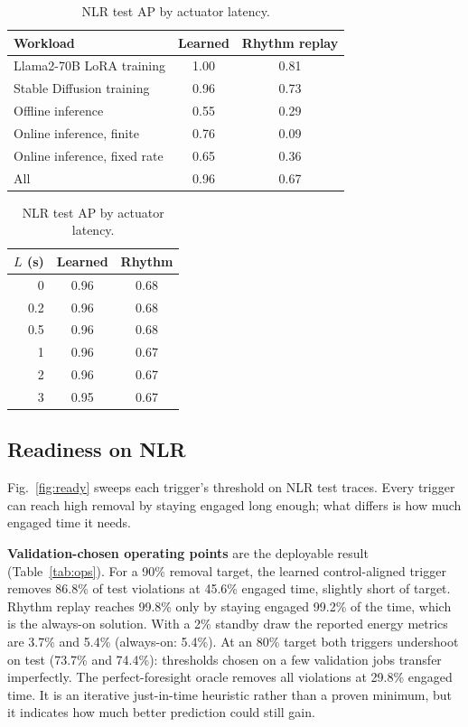 \documentclass[11pt]{article}
\begin{document}
\begin{table}[t]
\centering
\begin{minipage}[t]{0.55\textwidth}
\centering
\caption{NLR test AP on the control-aligned target, 1~s latency. Per-workload rows are point estimates;
each inference workload is a single session, so no interval is computed.}
\label{tab:wl}
\small
\begin{tabular}{@{}lcc@{}}
\toprule
Workload & Learned & Rhythm replay \\
\midrule
Llama2-70B LoRA training & 1.00 & 0.81 \\
Stable Diffusion training & 0.96 & 0.73 \\
Offline inference & 0.55 & 0.29 \\
Online inference, finite & 0.76 & 0.09 \\
Online inference, fixed rate & 0.65 & 0.36 \\
\midrule
All & 0.96 & 0.67 \\
\bottomrule
\end{tabular}
\end{minipage}\hfill
\begin{minipage}[t]{0.4\textwidth}
\centering
\caption{NLR test AP by actuator latency.}
\label{tab:lat}
\small
\begin{tabular}{@{}rcc@{}}
\toprule
$L$ (s) & Learned & Rhythm \\
\midrule
0 & 0.96 & 0.68 \\
0.2 & 0.96 & 0.68 \\
0.5 & 0.96 & 0.68 \\
1 & 0.96 & 0.67 \\
2 & 0.96 & 0.67 \\
3 & 0.95 & 0.67 \\
\bottomrule
\end{tabular}
\end{minipage}
\end{table}

\subsection{Readiness on NLR}
\label{sec:res-ready}

Fig.~\ref{fig:ready} sweeps each trigger's threshold on NLR test traces. Every trigger can reach high
removal by staying engaged long enough; what differs is how much engaged time it needs.

\textbf{Validation-chosen operating points} are the deployable result (Table~\ref{tab:ops}). For a 90\%
removal target, the learned control-aligned trigger removes 86.8\% of test violations
at 45.6\% engaged time, slightly short of target. Rhythm replay reaches
99.8\% only by staying engaged 99.2\% of the time,
which is the always-on solution. With a 2\% standby draw the reported energy metrics are
3.7\% and 5.4\% (always-on: 5.4\%).
At an 80\% target both triggers undershoot on test (73.7\% and
74.4\%): thresholds chosen on a few validation jobs transfer imperfectly. The
perfect-foresight oracle removes all violations at 29.8\% engaged time. It is an iterative
just-in-time heuristic rather than a proven minimum, but it indicates how much better prediction could
still gain.
\end{document}
